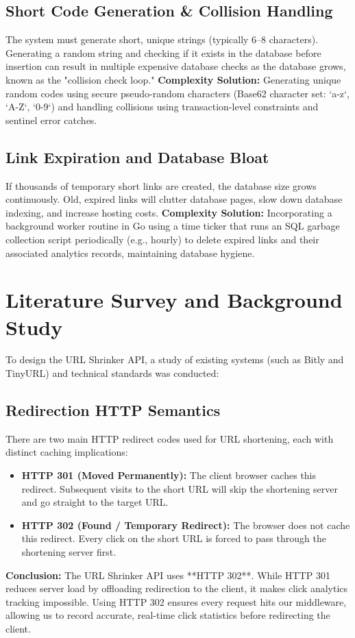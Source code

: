 \subsection{Short Code Generation \& Collision Handling}
The system must generate short, unique strings (typically 6–8 characters). Generating a random string and checking if it exists in the database before insertion can result in multiple expensive database checks as the database grows, known as the "collision check loop."
\textbf{Complexity Solution:} Generating unique random codes using secure pseudo-random characters (Base62 character set: `a-z`, `A-Z`, `0-9`) and handling collisions using transaction-level constraints and sentinel error catches.

\subsection{Link Expiration and Database Bloat}
If thousands of temporary short links are created, the database size grows continuously. Old, expired links will clutter database pages, slow down database indexing, and increase hosting costs.
\textbf{Complexity Solution:} Incorporating a background worker routine in Go using a time ticker that runs an SQL garbage collection script periodically (e.g., hourly) to delete expired links and their associated analytics records, maintaining database hygiene.

\section{Literature Survey and Background Study}
To design the URL Shrinker API, a study of existing systems (such as Bitly and TinyURL) and technical standards was conducted:

\subsection{Redirection HTTP Semantics}
There are two main HTTP redirect codes used for URL shortening, each with distinct caching implications:
\begin{itemize}
    \item \textbf{HTTP 301 (Moved Permanently):} The client browser caches this redirect. Subsequent visits to the short URL will skip the shortening server and go straight to the target URL.
    \item \textbf{HTTP 302 (Found / Temporary Redirect):} The browser does not cache this redirect. Every click on the short URL is forced to pass through the shortening server first.
\end{itemize}
\textbf{Conclusion:} The URL Shrinker API uses **HTTP 302**. While HTTP 301 reduces server load by offloading redirection to the client, it makes click analytics tracking impossible. Using HTTP 302 ensures every request hits our middleware, allowing us to record accurate, real-time click statistics before redirecting the client.


